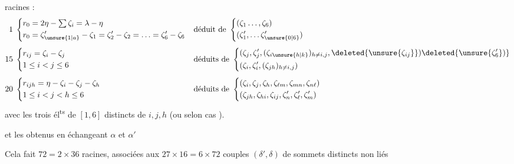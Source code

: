racines :
\[
\begin{aligned}
1\;&\left\{\begin{aligned}r_0&=2\eta-\textstyle\sum\zeta_i=\lambda-\eta\\
r_0&=\zeta'_{\unsure{1|a}}-\zeta_1=\zeta'_2-\zeta_2=\ldots=\zeta'_6-\zeta_6\end{aligned}\right.
&&\text{déduit de }\left\{\begin{aligned}&(\zeta_1\ldots,\zeta_6)\\&(\zeta'_1,\ldots\zeta'_{\unsure{0|6}})\end{aligned}\right.\\[4pt]
15\;&\left\{\begin{aligned}&r_{ij}=\zeta_i-\zeta_j\\&1\le i<j\le6\end{aligned}\right.
&&\text{déduits de }\left\{\begin{aligned}
&(\zeta_j,\zeta'_j,(\zeta_{i\unsure{h|k}})_{h\ne i,j},\deleted{\unsure{\zeta_{ij}}})\deleted{\unsure{\zeta'_6})}\\
&(\zeta_i,\zeta'_i,(\zeta_{jh})_{h\ne i,j})\end{aligned}\right.\\[4pt]
20\;&\left\{\begin{aligned}&r_{ijh}=\eta-\zeta_i-\zeta_j-\zeta_h\\&1\le i<j<h\le6\end{aligned}\right.
&&\text{déduits de }\left\{\begin{aligned}
&(\zeta_i,\zeta_j,\zeta_h,\zeta_{\ell m},\zeta_{mn},\zeta_{n\ell})\\
&(\zeta_{jh},\zeta_{hi},\zeta_{ij},\zeta'_n,\zeta'_\ell,\zeta'_m)\end{aligned}\right.
\end{aligned}
\]
avec   les trois él\textsuperscript{ts} de $[1,6]$ distincts de $i,j,h$ (ou selon cas ).

et les  obtenus en échangeant $\alpha$ et $\alpha'$

Cela fait $72=2\times36$ racines, associées aux $27\times16=6\times72$
 couples $(\delta',\delta)$ de sommets distincts non liés

